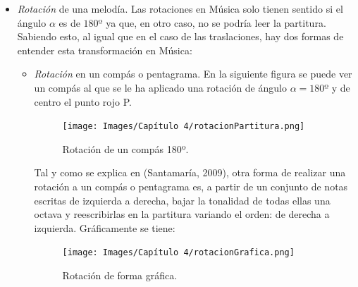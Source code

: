 \documentclass[a4paper, openright, 11pt, titlepage]{report}
\theoremstyle{definition}\newtheorem{defin}[propo]{Definition}
\theoremstyle{definition}\newtheorem{obser}[propo]{Remark}
\theoremstyle{definition}\newtheorem{ejem}[propo]{Ejemplo}
\theoremstyle{definition}\newtheorem{algoritmo}[propo]{Algoritmo}
\begin{document}
\begin{itemize}
\begin{enumerate}
    \end{enumerate}
    \item \textit{Rotación} de una melodía. Las rotaciones en Música solo tienen sentido si el ángulo $\alpha$ es de $180º$ ya que, en otro caso, no se podría leer la partitura. Sabiendo esto, al igual que en el caso de las traslaciones, hay dos formas de entender esta transformación en Música:
    \begin{itemize}
        \item \textit{Rotación} en un compás o pentagrama. En la siguiente figura se puede ver un compás al que se le ha aplicado una rotación de ángulo $\alpha = 180º$ y de centro el punto rojo P.
        \begin{figure}[H]
            \centering
            \texttt{[image: Images/Capítulo 4/rotacionPartitura.png]}
            \caption{Rotación de un compás 180º.}
        \end{figure}
        Tal y como se explica en \cite{santa} (Santamaría, 2009), otra forma de realizar una rotación a un compás o pentagrama es, a partir de un conjunto de notas escritas de izquierda a derecha, bajar la tonalidad de todas ellas una octava y reescribirlas en la partitura variando el orden: de derecha a izquierda. Gráficamente se tiene:
        \begin{figure}[H]
            \centering
            \texttt{[image: Images/Capítulo 4/rotacionGrafica.png]}
            \caption{Rotación de forma gráfica. \cite{santa}}
        \end{figure}
        

\end{itemize}
\end{itemize}
\end{document}
